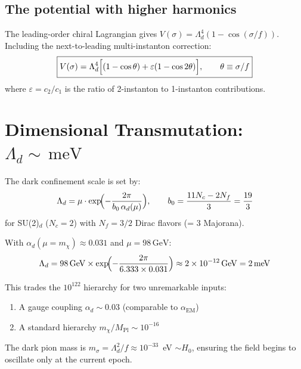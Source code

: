 \documentclass[11pt,a4paper]{article}
\newcommand{\Mpl}{M_{\mathrm{Pl}}}
\newcommand{\Ld}{\Lambda_d}
\newcommand{\meV}{\,\mathrm{meV}}
\newcommand{\GeV}{\,\mathrm{GeV}}
\begin{document}
\subsection{The potential with higher harmonics}

The leading-order chiral Lagrangian gives $V(\sigma) = \Ld^4(1 - \cos(\sigma/f))$.
Including the next-to-leading multi-instanton correction:
\begin{equation}\label{eq:potential}
  \boxed{V(\sigma) = \Ld^4\Bigl[(1 - \cos\theta) + \varepsilon(1 - \cos 2\theta)\Bigr],
  \qquad \theta \equiv \sigma/f}
\end{equation}
where $\varepsilon = c_2/c_1$ is the ratio of 2-instanton to 1-instanton contributions.

\section{Dimensional Transmutation: $\Ld \sim \meV$}
\label{sec:transmutation}

The dark confinement scale is set by:
\begin{equation}\label{eq:transmutation}
  \Ld = \mu \cdot \exp\!\Bigl(-\frac{2\pi}{b_0\,\alpha_d(\mu)}\Bigr),
  \qquad b_0 = \frac{11 N_c - 2 N_f}{3} = \frac{19}{3}
\end{equation}
for SU(2)$_d$ ($N_c = 2$) with $N_f = 3/2$ Dirac flavors (= 3 Majorana).

With $\alpha_d(\mu = m_\chi) \approx 0.031$ and $\mu = 98\GeV$:
\begin{equation}
  \Ld = 98\GeV \times \exp\!\Bigl(-\frac{2\pi}{6.333 \times 0.031}\Bigr) 
  \approx 2 \times 10^{-12}\GeV = 2\meV
\end{equation}

This trades the $10^{122}$ hierarchy for two unremarkable inputs:
\begin{enumerate}[nosep]
  \item A gauge coupling $\alpha_d \sim 0.03$ (comparable to $\alpha_{\mathrm{EM}}$)
  \item A standard hierarchy $m_\chi/\Mpl \sim 10^{-16}$
\end{enumerate}
The dark pion mass is $m_\sigma = \Ld^2/f \approx 10^{-33}$~eV $\sim H_0$, ensuring the field
begins to oscillate only at the current epoch.

\end{document}
